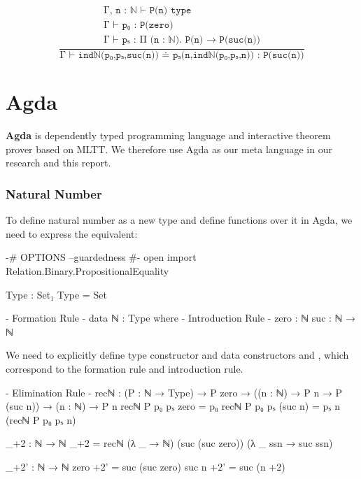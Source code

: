 \[
  \frac{
    \begin{array}{l}
      \texttt{Γ, n : ℕ ⊢ P(n) type} \\
      \texttt{Γ ⊢ p₀ : P(zero)} \\
      \texttt{Γ ⊢ pₛ : Π (n : ℕ). P(n) → P(suc(n))}
    \end{array}
  }{
    \texttt{Γ ⊢ indℕ(p₀,pₛ,suc(n)) ≐ pₛ(n,indℕ(p₀,pₛ,n)) : P(suc(n))}
  }
\]


\section{Agda}

\textbf{Agda} is dependently typed programming language and interactive theorem prover based on MLTT. We therefore use Agda as our meta language in our research and this report. 

\subsubsection*{Natural Number}

To define natural number  as a new type and define functions over it in Agda, we need to express the equivalent:

\begin{code}[hide]
{-# OPTIONS --guardedness #-}
open import Relation.Binary.PropositionalEquality

Type : Set₁
Type = Set
\end{code}

\begin{code}
{- Formation Rule -}
data ℕ : Type where
  {- Introduction Rule -}
  zero : ℕ
  suc  : ℕ → ℕ
\end{code}

We need to explicitly define type constructor  and data constructors  and , which correspond to the formation rule and introduction rule.

\begin{code}
{- Elimination Rule -}
recℕ : (P : ℕ → Type)
  → P zero
  → ((n : ℕ) → P n → P (suc n))
  → (n : ℕ) → P n
recℕ P p₀ pₛ zero = p₀
recℕ P p₀ pₛ (suc n) = pₛ n (recℕ P p₀ pₛ n)

_+2 : ℕ → ℕ
_+2 = recℕ (λ _ → ℕ) (suc (suc zero)) (λ _ ssn → suc ssn)

_+2' : ℕ → ℕ
zero +2' = suc (suc zero)
suc n +2' = suc (n +2)
\end{code}


